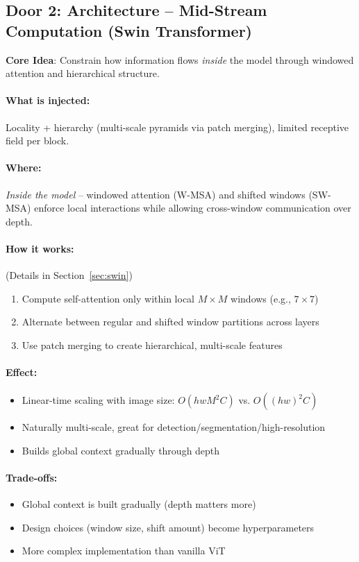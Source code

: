 \documentclass{article}
\begin{document}
\subsection{Door 2: Architecture -- Mid-Stream Computation (Swin Transformer)}

\textbf{Core Idea}: Constrain how information flows \textit{inside} the model through windowed attention and hierarchical structure.

\paragraph{What is injected:} Locality + hierarchy (multi-scale pyramids via patch merging), limited receptive field per block.

\paragraph{Where:} \textit{Inside the model} -- windowed attention (W-MSA) and shifted windows (SW-MSA) enforce local interactions while allowing cross-window communication over depth.

\paragraph{How it works:} (Details in Section~\ref{sec:swin})
\begin{enumerate}
\item Compute self-attention only within local $M \times M$ windows (e.g., $7 \times 7$)
\item Alternate between regular and shifted window partitions across layers
\item Use patch merging to create hierarchical, multi-scale features
\end{enumerate}

\paragraph{Effect:}
\begin{itemize}
\item Linear-time scaling with image size: $O(hwM^2C)$ vs. $O((hw)^2C)$
\item Naturally multi-scale, great for detection/segmentation/high-resolution
\item Builds global context gradually through depth
\end{itemize}

\paragraph{Trade-offs:}
\begin{itemize}
\item Global context is built gradually (depth matters more)
\item Design choices (window size, shift amount) become hyperparameters
\item More complex implementation than vanilla ViT
\end{itemize}
\end{document}
